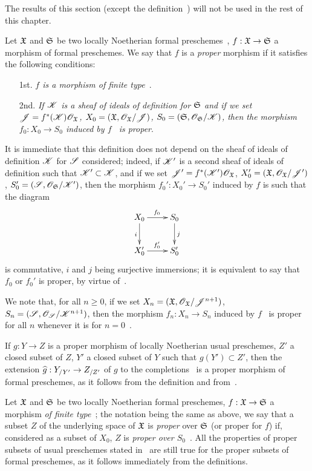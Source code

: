 The results of this section (except the definition~) will not be used in the rest of this chapter.

\begin{env}[3.4.1]
\label{3.3.4.1}
Let $\mathfrak{X}$ and $\mathfrak{S}$ be two locally Noetherian formal preschemes~, $f:\fk{X}\to\fk{S}$ a morphism of formal preschemes.
We say that $f$ is a \emph{proper} morphism if it satisfies the following conditions:
\begin{enumerate}
  \item[1st.] \emph{$f$ is a morphism of finite type~}.
  \item[2nd.] \emph{If $\mathscr{K}$ is a sheaf of ideals of definition for $\mathfrak{S}$ and if we set $\mathscr{J}=f^*(\mathscr{K})\mathscr{O}_\mathfrak{X}$, $X_0=(\mathfrak{X},\mathscr{O}_\mathfrak{X}/\mathscr{J})$, $S_0=(\mathfrak{S},\mathscr{O}_\mathfrak{S}/\mathscr{K})$, then the morphism $f_0:X_0\to S_0$ induced by $f$~ is proper}.
\end{enumerate}
It is immediate that this definition does not depend on the sheaf of ideals of definition $\mathscr{K}$ for $\mathscr{S}$ considered; indeed, if $\mathscr{K}'$ is a second sheaf of ideals of definition such that $\mathscr{K}'\subset\mathscr{K}$, and if we set $\mathscr{J}'=f^*(\mathscr{K}')\mathscr{O}_\mathfrak{X}$, $X_0'=(\mathfrak{X},\mathscr{O}_\mathfrak{X}/\mathscr{J}')$, $S_0'=(\mathscr{S},\mathscr{O}_\mathfrak{S}/\mathscr{K}')$, then the morphism $f_0':X_0'\to S_0'$ induced by $f$ is such that the diagram
\[
  \xymatrix{
    X_0\ar[r]^{f_0}\ar[d]_i &
    S_0\ar[d]^j\\
    X_0'\ar[r]^{f_0'} &
    S_0'
  }
\]
is commutative, $i$ and $j$ being surjective immersions; it is equivalent to say that $f_0$ or $f_0'$ is proper, by virtue of~.

We note that, for all $n\geq 0$, if we set $X_n=(\mathfrak{X},\mathscr{O}_\mathfrak{X}/\mathscr{J}^{n+1})$, $S_n=(\mathscr{S},\mathscr{O}_\mathscr{S}/\mathscr{K}^{n+1})$, then the morphism $f_n:X_n\to S_n$ induced by $f$~ is proper for all $n$ whenever it is for $n=0$~.

If $g:Y\to Z$ is a proper morphism of locally Noetherian usual preschemes, $Z'$ a closed subset of $Z$, $Y'$ a closed subset of $Y$ such that $g(Y')\subset Z'$, then the extension $\wh{g}:Y_{/Y'}\to Z_{/Z'}$ of $g$ to the completions~ is a proper morphism of formal preschemes, as it follows from the definition and from~.

Let $\mathfrak{X}$ and $\mathfrak{S}$ be two locally Noetherian formal preschemes, $f:\fk{X}\to\fk{S}$ a morphism \emph{of finite type}~; the notation being the same as above, we say that a subset $Z$ of the underlying space of $\mathfrak{X}$ is \emph{proper} over $\mathfrak{S}$ (or proper for $f$) if, considered as a subset of $X_0$, $Z$ is \emph{proper over $S_0$}~.
All the properties of proper subsets of usual preschemes stated in~ are still true for the proper subsets of formal preschemes, as it follows immediately from the definitions.
\end{env}





